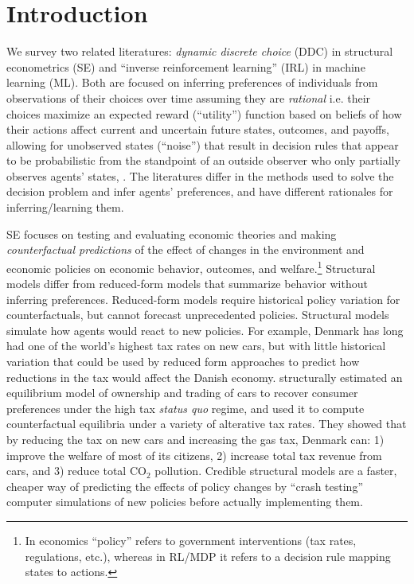 

\section{Introduction\label{sec:introduction}}

We survey two related literatures: {\it dynamic discrete choice\/} (DDC) in structural econometrics (SE) and ``inverse reinforcement learning'' (IRL) in machine learning (ML). Both are focused on inferring preferences of individuals from observations of their choices over time 
assuming they are {\it rational\/}  i.e. their
choices maximize an expected reward (``utility'') function based on beliefs of how
their actions affect current and uncertain future states, outcomes, and payoffs, allowing  
for unobserved states (``noise'') that result in decision rules that 
appear to be probabilistic from the standpoint of an outside observer who only partially observes agents'
states, \citet{rust:1987}. The literatures differ in the methods used to
solve the decision problem and infer agents' preferences, and have different rationales for inferring/learning them.

SE focuses on  testing and evaluating economic theories and making {\it counterfactual predictions\/}
of the effect of changes in the environment and
economic policies on economic behavior, outcomes, and welfare.\footnote{\footnotesize In economics ``policy'' refers to government interventions (tax rates, regulations, etc.), whereas
in RL/MDP it refers to a decision rule mapping states to actions.} 
Structural models differ from reduced-form models that summarize behavior without inferring
preferences. Reduced-form models require historical policy variation for counterfactuals,
but cannot forecast unprecedented policies. Structural models simulate how agents would
react to new policies.
For example, Denmark has long had one of the world's highest tax rates on new cars, but with little historical variation 
that could be used by reduced form approaches to predict how reductions in the tax would affect the Danish economy.
\citet{GIMRS:2022} structurally estimated an equilibrium model of ownership and trading of cars to recover consumer preferences
under the high tax {\it status quo\/} regime, and used it to compute counterfactual equilibria under a variety of alterative tax rates.
They showed that by reducing the tax on new cars and increasing the gas tax, Denmark can: 1) improve the welfare of most of its citizens,
2) increase total tax revenue from cars, and 3) reduce total $\mbox{CO}_2$ pollution.
Credible structural models are a faster, cheaper way of predicting the effects of policy changes by 
``crash testing'' computer simulations of new policies before actually implementing them.

